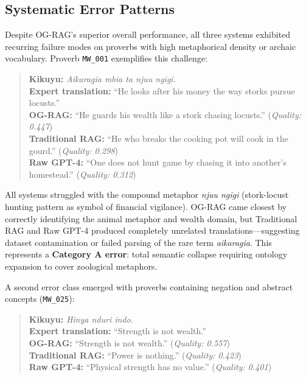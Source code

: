 \subsection{Systematic Error Patterns}
\label{subsec:error_patterns}

Despite OG-RAG's superior overall performance, all three systems exhibited recurring failure modes on proverbs with high metaphorical density or archaic vocabulary. Proverb \texttt{MW\_001} exemplifies this challenge:

\begin{quote}
\textbf{Kikuyu:} \emph{Aikaragia mbia ta njuu ngigi.}\\
\textbf{Expert translation:} ``He looks after his money the way storks pursue locusts.''\\
\textbf{OG-RAG:} ``He guards his wealth like a stork chasing locusts.'' (\textit{Quality: 0.447})\\
\textbf{Traditional RAG:} ``He who breaks the cooking pot will cook in the gourd.'' (\textit{Quality: 0.298})\\
\textbf{Raw GPT-4:} ``One does not hunt game by chasing it into another's homestead.'' (\textit{Quality: 0.312})
\end{quote}

All systems struggled with the compound metaphor \emph{njuu ngigi} (stork-locust hunting pattern as symbol of financial vigilance). OG-RAG came closest by correctly identifying the animal metaphor and wealth domain, but Traditional RAG and Raw GPT-4 produced completely unrelated translations—suggesting dataset contamination or failed parsing of the rare term \emph{aikaragia}. This represents a \textbf{Category A error}: total semantic collapse requiring ontology expansion to cover zoological metaphors.

A second error class emerged with proverbs containing negation and abstract concepts (\texttt{MW\_025}):

\begin{quote}
\textbf{Kikuyu:} \emph{Hinya nduri indo.}\\
\textbf{Expert translation:} ``Strength is not wealth.''\\
\textbf{OG-RAG:} ``Strength is not wealth.'' (\textit{Quality: 0.557})\\
\textbf{Traditional RAG:} ``Power is nothing.'' (\textit{Quality: 0.423})\\
\textbf{Raw GPT-4:} ``Physical strength has no value.'' (\textit{Quality: 0.401})
\end{quote}

